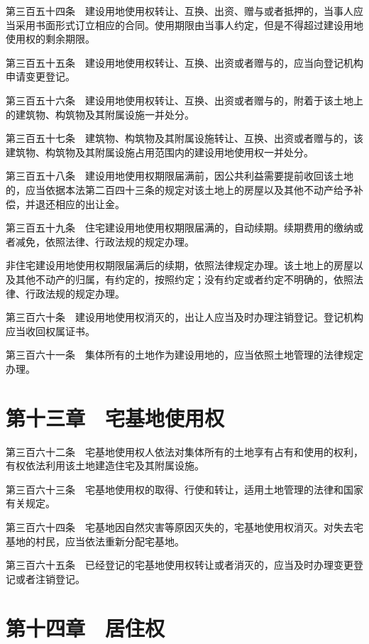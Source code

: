 \documentclass[UTF8,12pt,a4paper]{ctexbook}
\begin{document}
第三百五十四条　建设用地使用权转让、互换、出资、赠与或者抵押的，当事人应当采用书面形式订立相应的合同。使用期限由当事人约定，但是不得超过建设用地使用权的剩余期限。

第三百五十五条　建设用地使用权转让、互换、出资或者赠与的，应当向登记机构申请变更登记。

第三百五十六条　建设用地使用权转让、互换、出资或者赠与的，附着于该土地上的建筑物、构筑物及其附属设施一并处分。

第三百五十七条　建筑物、构筑物及其附属设施转让、互换、出资或者赠与的，该建筑物、构筑物及其附属设施占用范围内的建设用地使用权一并处分。

第三百五十八条　建设用地使用权期限届满前，因公共利益需要提前收回该土地的，应当依据本法第二百四十三条的规定对该土地上的房屋以及其他不动产给予补偿，并退还相应的出让金。

第三百五十九条　住宅建设用地使用权期限届满的，自动续期。续期费用的缴纳或者减免，依照法律、行政法规的规定办理。

非住宅建设用地使用权期限届满后的续期，依照法律规定办理。该土地上的房屋以及其他不动产的归属，有约定的，按照约定；没有约定或者约定不明确的，依照法律、行政法规的规定办理。

第三百六十条　建设用地使用权消灭的，出让人应当及时办理注销登记。登记机构应当收回权属证书。

第三百六十一条　集体所有的土地作为建设用地的，应当依照土地管理的法律规定办理。

\section*{第十三章　宅基地使用权}

第三百六十二条　宅基地使用权人依法对集体所有的土地享有占有和使用的权利，有权依法利用该土地建造住宅及其附属设施。

第三百六十三条　宅基地使用权的取得、行使和转让，适用土地管理的法律和国家有关规定。

第三百六十四条　宅基地因自然灾害等原因灭失的，宅基地使用权消灭。对失去宅基地的村民，应当依法重新分配宅基地。

第三百六十五条　已经登记的宅基地使用权转让或者消灭的，应当及时办理变更登记或者注销登记。

\section*{第十四章　居住权}
\end{document}
